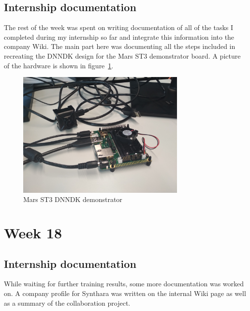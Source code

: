 \subsection{Internship documentation}
The rest of the week was spent on writing documentation of all of the tasks I completed during my internship so far and integrate this information into the company Wiki. The main part here was documenting all the steps included in recreating the \ac{DNNDK} design for the Mars ST3 demonstrator board. A picture of the hardware is shown in figure~\ref{fig:st3_demonstrator}.
\begin{figure}[!htb]
	\centering
		\includegraphics[width=0.75\textwidth]{bilder/ST3_demonstrator.jpg}
		\caption{Mars ST3 \acs{DNNDK} demonstrator}
		\label{fig:st3_demonstrator}
\end{figure}

\section{Week 18}
\subsection{Internship documentation}
While waiting for further training results, some more documentation was worked on. A company profile for Synthara was written on the internal Wiki page as well as a summary of the collaboration project.
